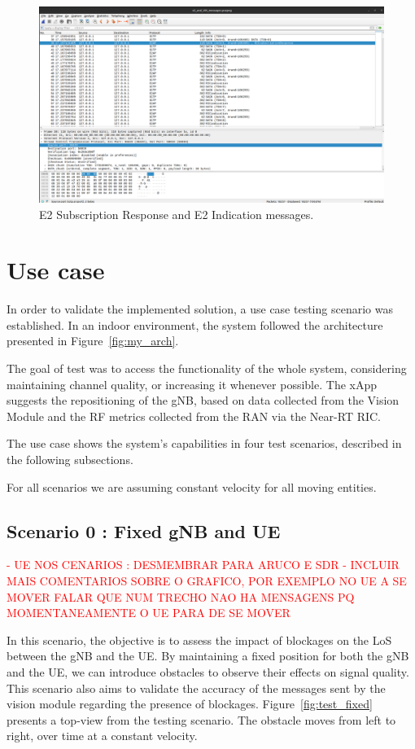 \begin{figure}[H]
    \centering
    \includegraphics[width=0.5\linewidth]{figures/ric_subs}
    \caption{E2 Subscription Response and E2 Indication messages.}
    \label{fig:captura_e2ap}
\end{figure}

\section{Use case}\label{sec:use_case}
In order to validate the implemented solution, a use case testing scenario was established.
In an indoor environment, the system followed the architecture presented in Figure~\ref{fig:my_arch}.

The goal of test was to access the functionality of the whole system, considering maintaining channel quality, or increasing it whenever possible.
The xApp suggests the repositioning of the gNB, based on data collected from the Vision Module and the RF metrics collected from the RAN via the Near-RT RIC\@.

The use case shows the system's capabilities in four test scenarios, described in the following subsections.

For all scenarios we are assuming constant velocity for all moving entities.

\subsection{Scenario 0 : Fixed gNB and UE}\label{subsec:scenario-0-:-fixed-gnb-and-ue}
\textcolor{red}{- UE NOS CENARIOS : DESMEMBRAR PARA ARUCO E SDR
- INCLUIR MAIS COMENTARIOS SOBRE O GRAFICO, POR EXEMPLO NO UE A SE MOVER FALAR QUE NUM TRECHO NAO HA MENSAGENS PQ MOMENTANEAMENTE O UE PARA DE SE MOVER}

In this scenario, the objective is to assess the impact of blockages on the LoS between the gNB and the UE\@.
By maintaining a fixed position for both the gNB and the UE, we can introduce obstacles to observe their effects on signal quality.
This scenario also aims to validate the accuracy of the messages sent by the vision module regarding the presence of blockages.
Figure~\ref{fig:test_fixed} presents a top-view from the testing scenario.
The obstacle moves from left to right, over time at a constant velocity.

